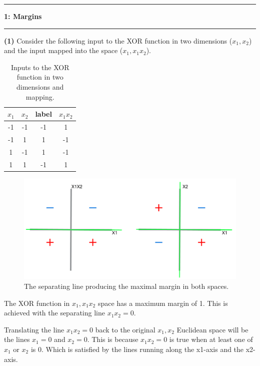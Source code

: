 \documentclass[11pt]{article}
\newcommand\question[2]{\vspace{.25in}\hrule\textbf{#1: #2}\vspace{.5em}\hrule\vspace{.10in}}
\renewcommand\part[1]{\vspace{.10in}\textbf{(#1)}}
\begin{document}
\raggedright
\newcommand\NAME{Jake Pitkin}  %
\newcommand\UID{u0891770}     %
\newcommand\HWNUM{5}              %

\question{1}{Margins}

\part{1} Consider the following input to the XOR function in two dimensions ($x_1, x_2$) and the input mapped into the space ($x_1, x_1x_2$).

 \begin{table}[H]
\centering
{\renewcommand{\arraystretch}{1.2}%
\begin{tabular}{| c | c | c | c |}
\hline
$x_1$ & $x_2$ & label & $x_1x_2$\\
\hline
-1 & -1 & -1 & 1\\ \hline
-1 & 1 & 1 & -1\\ \hline
1 & -1 & 1& -1 \\ \hline
1 & 1 & -1 & 1\\ \hline
\end{tabular}}
\caption{Inputs to the XOR function in two dimensions and mapping.}
\end{table}

\begin{figure}[H]
  \centerline{\includegraphics[width=0.8\linewidth]{1_1.png}}
  \caption{The separating line producing the maximal margin in both spaces.}
\end{figure}

The XOR function in $x_1, x_1x_2$ space has a maximum margin of 1. This is achieved with the separating line $x_1x_2 = 0$.

Translating the line $x_1x_2 = 0$ back to the original $x_1, x_2$ Euclidean space will be the lines $x_1 = 0$ and $x_2 = 0$. This is because $x_1x_2 = 0$ is true when at least one of $x_1$ or $x_2$ is 0. Which is satisfied by the lines running along the x1-axis and the x2-axis.
\end{document}
